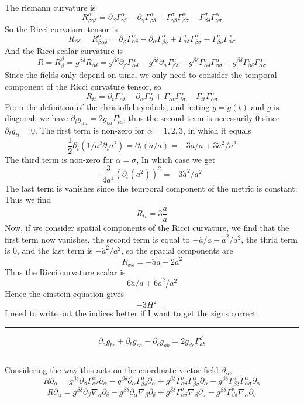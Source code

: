 The riemann curvature is
$$ R^\alpha_{\beta\gamma\delta} = \partial_\beta\Gamma^\alpha_{\gamma\delta} - \partial_\gamma\Gamma^\alpha_{\beta\delta}+\Gamma^\sigma_{\gamma\delta}\Gamma^\alpha_{\beta\sigma} - \Gamma^\sigma_{\beta\delta}\Gamma^\alpha_{\gamma\sigma} $$
So the Ricci curvature tensor is
$$ R_{\beta\delta} = R^\alpha_{\beta\alpha\delta} = \partial_\beta\Gamma^\alpha_{\alpha\delta} - \partial_\alpha\Gamma^\alpha_{\beta\delta}+\Gamma^\sigma_{\alpha\delta}\Gamma^\alpha_{\beta\sigma} - \Gamma^\sigma_{\beta\delta}\Gamma^\alpha_{\alpha\sigma} $$
And the Ricci scalar curvature is
$$ R = R_{\beta}^{\beta} = g^{\beta\delta}R_{\beta\delta} =
g^{\beta\delta}\partial_\beta\Gamma^\alpha_{\alpha\delta} -
g^{\beta\delta}\partial_\alpha\Gamma^\alpha_{\beta\delta}
+g^{\beta\delta}\Gamma^\sigma_{\alpha\delta}\Gamma^\alpha_{\beta\sigma} -
g^{\beta\delta}\Gamma^\sigma_{\beta\delta}\Gamma^\alpha_{\alpha\sigma} $$
Since the fields only depend on time, we only need to consider the temporal component of the Ricci curvature tensor, so
$$ R_{tt} = \partial_t \Gamma^{\alpha}_{\alpha t} - \partial_\alpha\Gamma^{\alpha}_{tt}
+ \Gamma^{\sigma}_{\alpha t}\Gamma^{\alpha}_{t \sigma} - \Gamma^{\sigma}_{tt}\Gamma^{\alpha}_{\alpha\sigma} $$
From the definition of the christoffel symbols, and noting $ g = g(t)$ and $g$ is diagonal, we have $\partial_t g_{aa} = 2g_{ba}\Gamma^b_{ta}$, thus
the second term is necessarily 0 since $\partial_t g_{tt} = 0$. The first term is non-zero for $\alpha = 1,2,3$, in which it equals 
$$ \frac{1}{2}\partial_t (1/a^2 \partial_t a^2) = \partial_t(\dot a / a) = -3\ddot a /a + 3\dot a^2 /a^2 $$
The third term is non-zero for $\alpha = \sigma$, In which case we get 
$$ \frac{3}{4a^4}(\partial_t (a^2))^2 =  -3\dot a^2/a^2  $$
The last term is vanishes since the temporal component of the metric is constant. Thus we find
$$ R_{tt} = 3\frac{\ddot a}{a}$$
Now, if we consider spatial components of the Ricci curvature, we find that the first term now vanishes, the second term is equal to $ -\ddot a/a - \dot a^2/a^2$, the thrid term is 0, and the last term is $-\dot a^2/a^2$, so the spacial components are
$$ R_{xx} = -\ddot a  a - 2\dot a^2$$
Thus the Ricci curvature scalar is
$$ 6\ddot a/a + 6\dot a^2/a^2 $$
Hence the einstein equation gives
$$ -3H^2 =  $$
I need to write out the indices better if I want to get the signs correct.

\hrule
$$ \partial_ag_{bc} + \partial_bg_{ca} - \partial_cg_{ab} = 2g_{dc}\Gamma^d_{ab} $$

\hrule
Considering the way this acts on the coordinate vector field $\partial_\alpha$, 
$$ R\partial_\alpha =
g^{\beta\delta}\partial_\beta\Gamma^\alpha_{\alpha\delta}\partial_\alpha -
g^{\beta\delta}\partial_\alpha\Gamma^\alpha_{\beta\delta}\partial_\alpha
+g^{\beta\delta}\Gamma^\sigma_{\alpha\delta}\Gamma^\alpha_{\beta\sigma}\partial_\alpha -
g^{\beta\delta}\Gamma^\sigma_{\beta\delta}\Gamma^\alpha_{\alpha\sigma} \partial_\alpha $$
$$ R\partial_\alpha =
g^{\beta\delta}\partial_\beta \nabla_\alpha\partial_\delta -
g^{\beta\delta}\partial_\alpha \nabla_\beta\partial_\delta
+g^{\beta\delta}\Gamma^\sigma_{\alpha\delta} \nabla_\beta\partial_\sigma -
g^{\beta\delta}\Gamma^\sigma_{\beta\delta} \nabla_\alpha \partial_\sigma $$